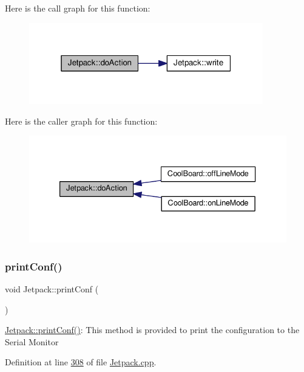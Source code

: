 Here is the call graph for this function\+:\nopagebreak
\begin{figure}[H]
\begin{center}
\leavevmode
\includegraphics[width=289pt]{class_jetpack_a86d2e83436ef4b85f4c3a6e85ac785b0_cgraph}
\end{center}
\end{figure}
Here is the caller graph for this function\+:
\nopagebreak
\begin{figure}[H]
\begin{center}
\leavevmode
\includegraphics[width=333pt]{class_jetpack_a86d2e83436ef4b85f4c3a6e85ac785b0_icgraph}
\end{center}
\end{figure}
\mbox{\label{class_jetpack_ac54a7bb4f9166bee32052253d9b1d306}} 
\subsubsection{\texorpdfstring{print\+Conf()}{printConf()}}
{\footnotesize\ttfamily void Jetpack\+::print\+Conf (\begin{DoxyParamCaption}{ }\end{DoxyParamCaption})}

\hyperlink{class_jetpack_ac54a7bb4f9166bee32052253d9b1d306}{Jetpack\+::print\+Conf()}\+: This method is provided to print the configuration to the Serial Monitor 

Definition at line \hyperlink{_jetpack_8cpp_source_l00308}{308} of file \hyperlink{_jetpack_8cpp_source}{Jetpack.\+cpp}.



